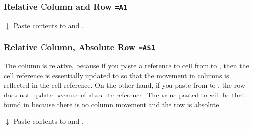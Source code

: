 \subsubsection{Relative Column and Row \texttt{=A1}}

\begin{center}

$\downarrow$ Paste  contents to  and .

\end{center}


\subsubsection{Relative Column, Absolute Row \texttt{=A\$1}}

The column is relative, because if you paste a reference to cell  from  to , then the cell reference is essentially updated to  so that the movement in columns is reflected in the cell reference. On the other hand, if you paste  from  to , the row does not update because of absolute reference. The value pasted to  will be that found in  because there is no column movement and the row is absolute. 

\begin{center}

$\downarrow$ Paste  contents to  and .

\end{center}

